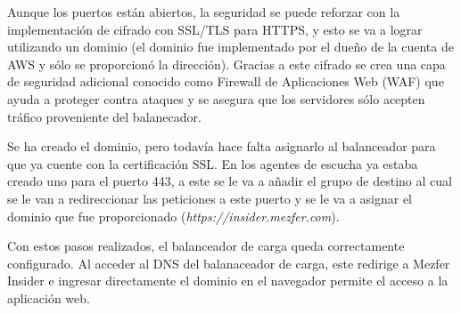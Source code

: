 Aunque los puertos están abiertos, la seguridad se puede reforzar con la implementación de cifrado con SSL/TLS para HTTPS, y esto se va a lograr utilizando un dominio (el dominio fue implementado por el dueño de la cuenta de AWS y sólo se proporcionó la dirección). Gracias a este cifrado se crea una capa de seguridad adicional conocido como Firewall de Aplicaciones Web (WAF) que ayuda a proteger contra ataques y se asegura que los servidores sólo acepten tráfico proveniente del balanecador.

Se ha creado el dominio, pero todavía hace falta asignarlo al balanceador para que ya cuente con la certificación SSL. En los agentes de escucha ya estaba creado uno para el puerto 443, a este se le va a añadir el grupo de destino al cual se le van a redireccionar las peticiones a este puerto y se le va a asignar el dominio que fue proporcionado (\emph{https://insider.mezfer.com}).

Con estos pasos realizados, el balanceador de carga queda correctamente configurado. Al acceder al DNS del balanaceador de carga, este redirige a Mezfer Insider e ingresar directamente el dominio en el navegador permite el acceso a la aplicación web.